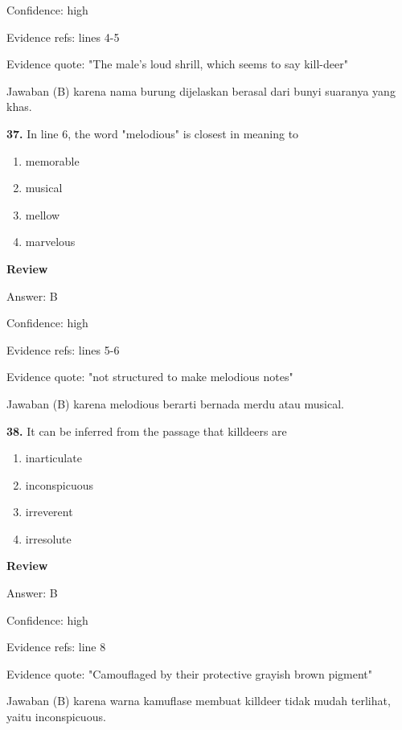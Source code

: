 \documentclass[12pt]{article}
\begin{document}
Confidence: high\par
Evidence refs: lines 4-5\par
Evidence quote: "The male's loud shrill, which seems to say kill-deer"\par
Jawaban (B) karena nama burung dijelaskan berasal dari bunyi suaranya yang khas.\par
\endgroup
\par
\vspace{0.25\baselineskip}
\noindent\textbf{37.} In line 6, the word "melodious" is closest in meaning to
\begin{enumerate}[label=(\Alph*),leftmargin=*,itemsep=0.2em]
\item memorable
\item musical
\item mellow
\item marvelous
\end{enumerate}
\par
\begingroup
\setlength{\parskip}{0pt}
\setlength{\parindent}{0pt}
\textbf{Review}\par
Answer: B\par
Confidence: high\par
Evidence refs: lines 5-6\par
Evidence quote: "not structured to make melodious notes"\par
Jawaban (B) karena melodious berarti bernada merdu atau musical.\par
\endgroup
\par
\vspace{0.25\baselineskip}
\noindent\textbf{38.} It can be inferred from the passage that killdeers are
\begin{enumerate}[label=(\Alph*),leftmargin=*,itemsep=0.2em]
\item inarticulate
\item inconspicuous
\item irreverent
\item irresolute
\end{enumerate}
\par
\begingroup
\setlength{\parskip}{0pt}
\setlength{\parindent}{0pt}
\textbf{Review}\par
Answer: B\par
Confidence: high\par
Evidence refs: line 8\par
Evidence quote: "Camouflaged by their protective grayish brown pigment"\par
Jawaban (B) karena warna kamuflase membuat killdeer tidak mudah terlihat, yaitu inconspicuous.\par
\end{document}
